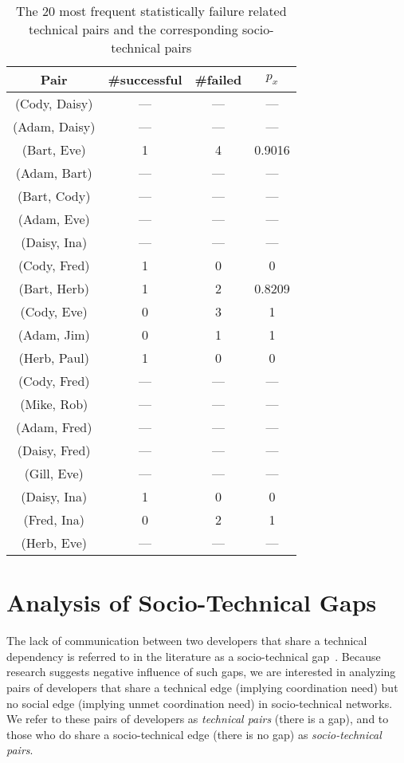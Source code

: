\begin{table}[t]
\centering
\caption{The 20 most frequent statistically failure related technical pairs and the corresponding socio-technical pairs}
\begin{tabular}{@{\hspace{.2cm}}ccc@{\hspace{.75cm}}c@{\hspace{.2cm}}}
\toprule
Pair & \#successful & \#failed & $p_x$ \\
\midrule
(Cody, Daisy)	&	---&	---&	---\\
(Adam, Daisy)	&	---&	---&	---\\
(Bart, Eve)	&	1&	4&	0.9016\\
(Adam, Bart)	&	---&	---&	---\\
(Bart, Cody)	&	---&	---&	---\\
(Adam, Eve)	&	---&	---&	---\\
(Daisy, Ina)	&	---&	---&	---\\
(Cody, Fred)	&	1&	0&	0\\
(Bart, Herb)	&	1&	2&	0.8209\\
(Cody, Eve)	&	0&	3&	1\\
(Adam, Jim)	&	0&	1&	1\\
(Herb, Paul)	&	1&	0&	0\\
(Cody, Fred)	&	---&	---&	---\\
(Mike, Rob)	&	---&	---&	---\\
(Adam, Fred)	&	---&	---&	---\\
(Daisy, Fred)	&	---&	---&	---\\
(Gill, Eve)		&	---&	---&	---\\
(Daisy, Ina)	&	1&	0&	0\\
(Fred, Ina)	&	0&	2&	1\\
(Herb, Eve)	&	---&	---&	---\\
\bottomrule
\end{tabular}
\label{tab:stechpairs}
\end{table}


\section{Analysis of Socio-Technical Gaps}
\label{ch8:gaps}
The lack of communication between two developers that share a
technical dependency is referred to in the literature as a
socio-technical gap~\cite{valetto:msr:2007}. Because research suggests negative influence of such gaps, we are interested in analyzing pairs of developers that share a technical edge (implying coordination need) but no social edge (implying
unmet coordination need) in socio-technical networks. We refer to these pairs of
developers as \emph{technical pairs} (there is a gap), and to those who do
share a socio-technical edge (there is no gap) as \emph{socio-technical pairs}. 


